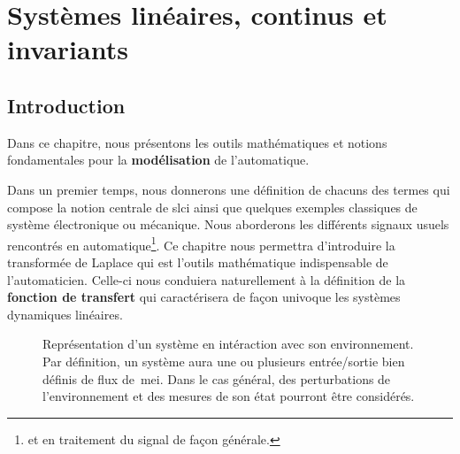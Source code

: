 \chapter[Systèmes linéaires, continus\ldots]
        {Systèmes linéaires, continus et invariants \label{chap-slci}}
\adjustmtc
\minitoc
\newpage
\section{Introduction}
Dans ce chapitre, nous présentons les outils mathématiques 
et notions fondamentales pour la \textbf{modélisation} de l'automatique.

Dans un premier temps, nous donnerons une définition de chacuns 
des termes qui compose la notion centrale de \gls{slci} ainsi que quelques
exemples classiques de système électronique ou mécanique.
Nous aborderons les différents signaux usuels rencontrés
en automatique\footnote{et en traitement du signal de façon générale.}.
Ce chapitre nous permettra d'introduire la transformée de Laplace qui 
est l'outils mathématique indispensable de l'automaticien.
Celle-ci nous conduiera naturellement à la définition 
de la \textbf{fonction de transfert} qui caractérisera de façon univoque 
les systèmes dynamiques linéaires.

\begin{figure}[!h]
\begin{center}
    
\end{center}
\caption{Représentation d'un système en intéraction avec son environnement. 
         Par définition, un système aura une ou plusieurs entrée/sortie bien 
	 définis de flux de~\gls{mei}. Dans le cas général, des perturbations 
	 de l'environnement et des mesures de son état pourront être considérés.
	 \label{fig-systeme}}
\end{figure}

